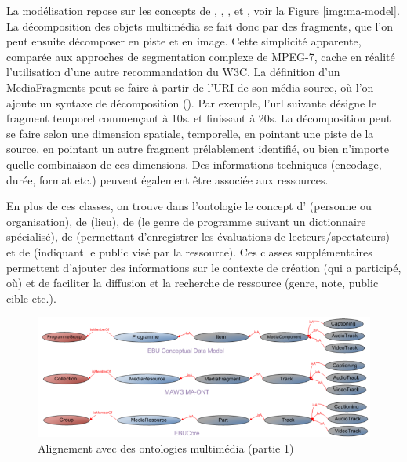 La modélisation repose sur les concepts de , , ,  et , voir la Figure \ref{img:ma-model}.
La décomposition des objets multimédia se fait donc par des fragments, que l'on peut ensuite décomposer en piste et en image.
Cette simplicité apparente, comparée aux approches de segmentation complexe de MPEG-7, cache en réalité l'utilisation d'une autre recommandation du W3C.
La définition d'un MediaFragments peut se faire à partir de l'URI de son média source, où l'on ajoute un syntaxe de décomposition (\cite{Hausenblas2011}).
Par exemple, l'url suivante  désigne le fragment temporel commençant à 10s. et finissant à 20s.
La décomposition peut se faire selon une dimension spatiale, temporelle, en pointant une piste de la source, en pointant un autre fragment prélablement identifié, ou bien n'importe quelle combinaison de ces dimensions.
Des informations techniques (encodage, durée, format etc.) peuvent également être associée aux ressources.

En plus de ces classes, on trouve dans l'ontologie le concept d' (personne ou organisation), de  (lieu), de  (le genre de programme suivant un dictionnaire spécialisé), de  (permettant d'enregistrer les évaluations de lecteurs/spectateurs) et de  (indiquant le public visé par la ressource).
Ces classes supplémentaires permettent d'ajouter des informations sur le contexte de création (qui a participé, où) et de faciliter la diffusion et la recherche de ressource (genre, note, public cible etc.).

\begin{figure}[ht!]
\centering
\includegraphics[width=\textwidth]{images/MA-alignement-A.png}
\caption{Alignement avec des ontologies multimédia (partie 1)}
\label{img:ma-alignement-A}
\end{figure}


